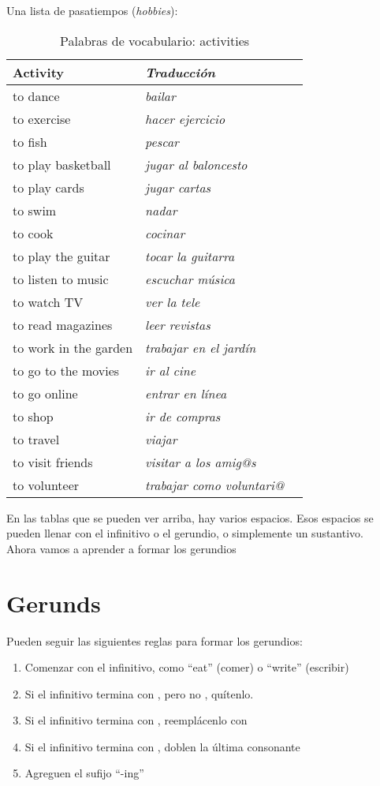 Una lista de pasatiempos (\emph{hobbies}):
\begin{table}[H]
	\centering
	\begin{tabular}{lll}
	\toprule
		\textbf{Activity} & \textbf{\emph{Traducci\'on}} &\\
	\midrule
		to dance & \emph{bailar} \\
		to exercise & \emph{hacer ejercicio}  \\
		to fish & \emph{pescar} \\
		to play basketball & \emph{jugar al baloncesto} \\
		to play cards & \emph{jugar cartas} \\
		to swim & \emph{nadar} \\
		to cook & \emph{cocinar} \\
		to play the guitar & \emph{tocar la guitarra} \\
		to listen to music & \emph{escuchar música} \\
		to watch TV & \emph{ver la tele} \\
		to read magazines & \emph{leer revistas} \\
		to work in the garden & \emph{trabajar en el jardín} \\
		to go to the movies & \emph{ir al cine} \\
		to go online & \emph{entrar en línea} \\
		to shop & \emph{ir de compras} \\
		to travel & \emph{viajar} \\
		to visit friends & \emph{visitar a los amig@s} \\
		to volunteer & \emph{trabajar como voluntari@} \\
	\bottomrule
	\end{tabular}
	\caption{Palabras de vocabulario: activities}
\end{table}

En las tablas que se pueden ver arriba, hay varios espacios.
Esos espacios se pueden llenar con el infinitivo o el gerundio, o simplemente un sustantivo. \\

Ahora vamos a aprender a formar los gerundios
\section{Gerunds}

Pueden seguir las siguientes reglas para formar los gerundios:
\begin{enumerate}[noitemsep]
	\item Comenzar con el infinitivo, como ``eat'' (comer) o ``write'' (escribir)
	\item Si el infinitivo termina con , pero no , quítenlo.
	\item Si el infinitivo termina con , reemplácenlo con 
	\item Si el infinitivo termina con , doblen la última consonante
	\item Agreguen el sufijo ``-ing''
\end{enumerate}

